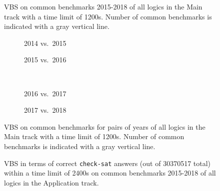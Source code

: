 \documentclass[dvipsnames,table,twoside,11pt]{article}
\begin{document}

\begin{figure}
  \centering
  \caption{VBS on common benchmarks 2015-2018 of all logics in the Main track
  with a time limit of 1200s. Number of common benchmarks is indicated with a
  gray vertical line.}
  \label{fig:progress-all}
\end{figure}

\begin{figure}
  \begin{subfigure}[t]{0.5\textwidth}
    \caption{2014 vs.~2015}
  \end{subfigure}
  \begin{subfigure}[t]{0.5\textwidth}
    \caption{2015 vs.~2016}
  \end{subfigure}
  \\[2ex]
  \begin{subfigure}[t]{0.5\textwidth}
    \caption{2016 vs.~2017}
  \end{subfigure}
  \begin{subfigure}[t]{0.5\textwidth}
    \caption{2017 vs.~2018}
  \end{subfigure}
  \caption{VBS on common benchmarks for pairs of years of all logics in the
  Main track with a time limit of 1200s. Number of common benchmarks is
  indicated with a gray vertical line.}
  \label{fig:progress}
\end{figure}

\begin{figure}
  \centering
  \vspace{-5ex}
  \caption{VBS in terms of correct \texttt{check-sat} answers
  (out of 30370517 total)
  within a time limit of 2400s
  on common benchmarks 2015-2018 of all logics in the Application
  track.}
  \label{fig:progress-all-app}
\end{figure}
\end{document}
